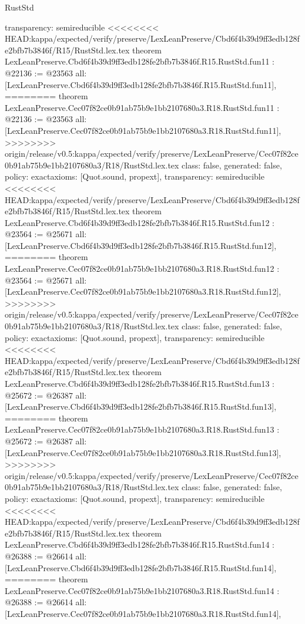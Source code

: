 \begin{lexlean}{RustStd}
\begin{coremodule}
{\begin{coremodule}
{{{{{{{{{{{{{{  transparency: semireducible
}
<<<<<<<< HEAD:kappa/expected/verify/preserve/LexLeanPreserve/Cbd6f4b39d9ff3edb128fe2bfb7b3846f/R15/RustStd.lex.tex
theorem LexLeanPreserve.Cbd6f4b39d9ff3edb128fe2bfb7b3846f.R15.RustStd.fun11 : @22136 := @23563 {
  all: [LexLeanPreserve.Cbd6f4b39d9ff3edb128fe2bfb7b3846f.R15.RustStd.fun11],
========
theorem LexLeanPreserve.Cec07f82ce0b91ab75b9e1bb2107680a3.R18.RustStd.fun11 : @22136 := @23563 {
  all: [LexLeanPreserve.Cec07f82ce0b91ab75b9e1bb2107680a3.R18.RustStd.fun11],
>>>>>>>> origin/release/v0.5:kappa/expected/verify/preserve/LexLeanPreserve/Cec07f82ce0b91ab75b9e1bb2107680a3/R18/RustStd.lex.tex
  class: false,
  generated: false,
  policy: exact{axioms: [Quot.sound, propext]},
  transparency: semireducible
}
<<<<<<<< HEAD:kappa/expected/verify/preserve/LexLeanPreserve/Cbd6f4b39d9ff3edb128fe2bfb7b3846f/R15/RustStd.lex.tex
theorem LexLeanPreserve.Cbd6f4b39d9ff3edb128fe2bfb7b3846f.R15.RustStd.fun12 : @23564 := @25671 {
  all: [LexLeanPreserve.Cbd6f4b39d9ff3edb128fe2bfb7b3846f.R15.RustStd.fun12],
========
theorem LexLeanPreserve.Cec07f82ce0b91ab75b9e1bb2107680a3.R18.RustStd.fun12 : @23564 := @25671 {
  all: [LexLeanPreserve.Cec07f82ce0b91ab75b9e1bb2107680a3.R18.RustStd.fun12],
>>>>>>>> origin/release/v0.5:kappa/expected/verify/preserve/LexLeanPreserve/Cec07f82ce0b91ab75b9e1bb2107680a3/R18/RustStd.lex.tex
  class: false,
  generated: false,
  policy: exact{axioms: [Quot.sound, propext]},
  transparency: semireducible
}
<<<<<<<< HEAD:kappa/expected/verify/preserve/LexLeanPreserve/Cbd6f4b39d9ff3edb128fe2bfb7b3846f/R15/RustStd.lex.tex
theorem LexLeanPreserve.Cbd6f4b39d9ff3edb128fe2bfb7b3846f.R15.RustStd.fun13 : @25672 := @26387 {
  all: [LexLeanPreserve.Cbd6f4b39d9ff3edb128fe2bfb7b3846f.R15.RustStd.fun13],
========
theorem LexLeanPreserve.Cec07f82ce0b91ab75b9e1bb2107680a3.R18.RustStd.fun13 : @25672 := @26387 {
  all: [LexLeanPreserve.Cec07f82ce0b91ab75b9e1bb2107680a3.R18.RustStd.fun13],
>>>>>>>> origin/release/v0.5:kappa/expected/verify/preserve/LexLeanPreserve/Cec07f82ce0b91ab75b9e1bb2107680a3/R18/RustStd.lex.tex
  class: false,
  generated: false,
  policy: exact{axioms: [Quot.sound, propext]},
  transparency: semireducible
}
<<<<<<<< HEAD:kappa/expected/verify/preserve/LexLeanPreserve/Cbd6f4b39d9ff3edb128fe2bfb7b3846f/R15/RustStd.lex.tex
theorem LexLeanPreserve.Cbd6f4b39d9ff3edb128fe2bfb7b3846f.R15.RustStd.fun14 : @26388 := @26614 {
  all: [LexLeanPreserve.Cbd6f4b39d9ff3edb128fe2bfb7b3846f.R15.RustStd.fun14],
========
theorem LexLeanPreserve.Cec07f82ce0b91ab75b9e1bb2107680a3.R18.RustStd.fun14 : @26388 := @26614 {
  all: [LexLeanPreserve.Cec07f82ce0b91ab75b9e1bb2107680a3.R18.RustStd.fun14],
}}}}}}}}}}}}}}}}}}
\end{coremodule}}
\end{coremodule}
\end{lexlean}
